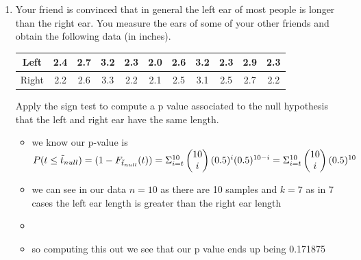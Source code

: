 \documentclass[12pt,twoside]{article}
\begin{document}
\begin{enumerate}
\begin{enumerate}
\item Your friend is convinced that in general the left ear of most people is longer than the right ear. You measure the ears of some of your other friends and obtain the following data (in inches).
\renewcommand{\arraystretch}{1.5}
\begin{center}
\begin{tabular}{ | c | c | c | c | c | c | c | c | c | c | c |  } %
  \hline			
Left  & 2.4 & 2.7 & 3.2 & 2.3 & 2.0 & 2.6 & 3.2 & 2.3 & 2.9 & 2.3  \\
  \hline			
 Right  &  2.2 & 2.6 & 3.3 & 2.2 & 2.1 & 2.5 & 3.1 & 2.5 & 2.7 & 2.2  \\
  \hline  
 \end{tabular}
\end{center} 
Apply the sign test to compute a p value associated to the null hypothesis that the left and right ear have the same length. 
\begin{itemize}
  \color{blue}
  \item we know our p-value is $P(t\leq \Tilde{t}_{null})=(1-F_{\Tilde{t}_{null}}(t))=\Sigma_{i=t}^{10}\begin{pmatrix}
    10\\i
  \end{pmatrix}(0.5)^{i}(0.5)^{10-i}=\Sigma_{i=t}^{10}\begin{pmatrix}
    10\\i
  \end{pmatrix}(0.5)^{10}$
  \item we can see in our data $n=10$ as there are 10 samples and $k=7$ as in 7 cases the left ear length is greater than the right ear length
    \item \inputminted[firstline=12, lastline=20, breaklines=True]{python}{hw7.py}
  \item so computing this out we see that our p value ends up being 0.171875
\end{itemize}


\end{enumerate}
\end{enumerate}
\end{document}
